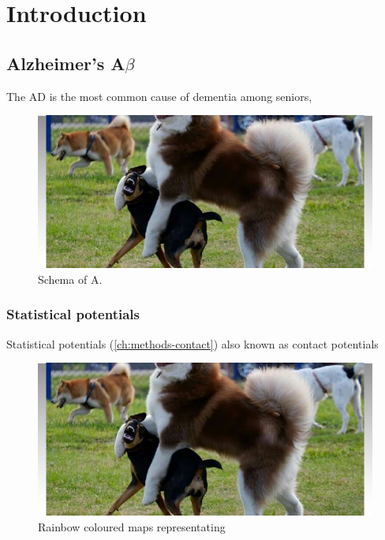 \chapter{Introduction}\label{ch:intro}

\section{Alzheimer’s A\texorpdfstring{$\beta$}{B}}\label{ch:iAB}
The \acs{AD} is the most common cause of dementia among seniors\citep{T40}, 

\lipsum[1-4]

\begin{figure}[!htb]
    \myfloatalign
    \includegraphics[width=.95\linewidth]{img/fig1.png} \quad
    \caption
    {
    Schema of A.
    }\label{fig:i01f1}
\end{figure}

\subsection{Statistical potentials}\label{ch:methods-contact}

Statistical potentials  (\autoref{ch:methods-contact}) also known as contact potentials \citep{T8,batteriesSusantyoko2015}


\begin{figure}[!htb]
    \myfloatalign
    \includegraphics[width=.82\linewidth]{img/fig1.png} \quad
    \caption
    {
    Rainbow coloured maps representating 
    }\label{fig:AP02ch01f1}
\end{figure}

